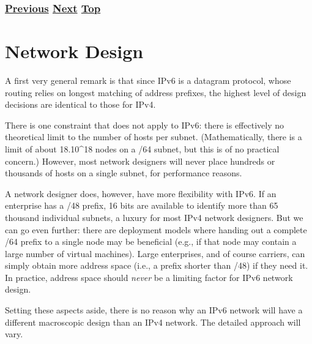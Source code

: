 \documentclass[
]{article}
\begin{document}
\subsubsection{\texorpdfstring{\hyperref[filtering]{Previous}
\hyperref[network-design]{Next}
\hyperref[security]{Top}}{Previous Next Top}}\label{previous-next-top-25}

\pagebreak

\section{Network Design}\label{network-design}

A first very general remark is that since IPv6 is a datagram protocol,
whose routing relies on longest matching of address prefixes, the
highest level of design decisions are identical to those for IPv4.

There is one constraint that does not apply to IPv6: there is
effectively no theoretical limit to the number of hosts per subnet.
(Mathematically, there is a limit of about 18.10\^{}18 nodes on a /64
subnet, but this is of no practical concern.) However, most network
designers will never place hundreds or thousands of hosts on a single
subnet, for performance reasons.

A network designer does, however, have more flexibility with IPv6. If an
enterprise has a /48 prefix, 16 bits are available to identify more than
65 thousand individual subnets, a luxury for most IPv4 network
designers. But we can go even further: there are deployment models where
handing out a complete /64 prefix to a single node may be beneficial
(e.g., if that node may contain a large number of virtual machines).
Large enterprises, and of course carriers, can simply obtain more
address space (i.e., a prefix shorter than /48) if they need it. In
practice, address space should \emph{never} be a limiting factor for
IPv6 network design.

Setting these aspects aside, there is no reason why an IPv6 network will
have a different macroscopic design than an IPv4 network. The detailed
approach will vary.
\end{document}
